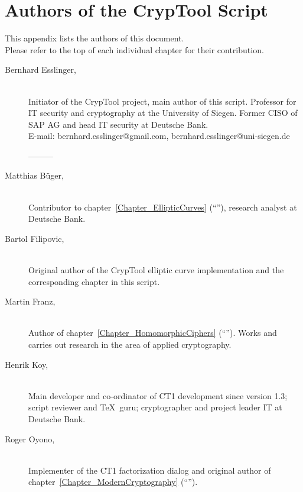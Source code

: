 \newpage
\hypertarget{appendix-authors}{}
\section{Authors of the CrypTool Script}
\label{s:appendix-authors}

This appendix lists the authors of this document.\\
Please refer to the top of each individual chapter for their contribution.

\begin{description}

\item[Bernhard Esslinger,] \mbox{}\\
Initiator of the CrypTool project, main author of this script. Professor for IT security and cryptography at the University of Siegen. Former CISO of SAP AG and head IT security at Deutsche Bank.\\
E-mail: bernhard.esslinger@gmail.com, bernhard.esslinger@uni-siegen.de

---------

\item[Matthias B\"uger,] \mbox{}\\ 
Contributor to chapter~\ref{Chapter_EllipticCurves} (``''),
research analyst at Deutsche Bank.

\item[Bartol Filipovic,] \mbox{}\\
Original author of the CrypTool elliptic curve
implementation and the corresponding chapter in this script.

\item[Martin Franz,] \mbox{}\\
Author of chapter~\ref{Chapter_HomomorphicCiphers}
(``'').
Works and carries out research in the area of applied cryptography.

\item[Henrik Koy,] \mbox{}\\
Main developer and co-ordinator of CT1 development
since version 1.3; script reviewer and \TeX\ guru; cryptographer 
and project leader IT at Deutsche Bank.

\item[Roger Oyono,] \mbox{}\\
Implementer of the CT1 factorization dialog and original author
of chapter~\ref{Chapter_ModernCryptography} (``'').


\end{description}

